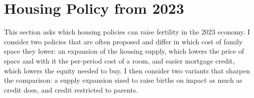 
\section{Housing Policy from 2023}
\label{sec:policy}


This section asks which housing policies can raise fertility in the 2023
economy. I consider two policies that are often proposed and differ in which
cost of family space they lower: an expansion of the housing supply, which
lowers the price of space and with it the per-period cost of a room, and
easier mortgage credit, which lowers the equity needed to buy. I then consider
two variants that sharpen the comparison: a supply expansion sized to raise
births on impact as much as credit does, and credit restricted to parents.

